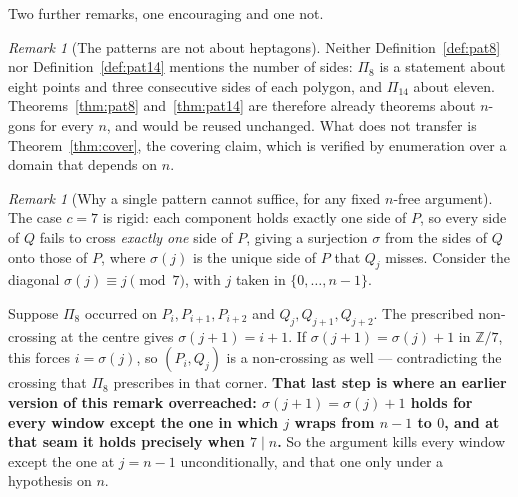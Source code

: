 \documentclass[11pt,a4paper]{article}
\theoremstyle{plain}
\theoremstyle{definition}
\theoremstyle{remark}
\newtheorem{remark}[theorem]{Remark}
\begin{document}
Two further remarks, one encouraging and one not.

\begin{remark}[The patterns are not about heptagons]
Neither Definition~\ref{def:pat8} nor Definition~\ref{def:pat14} mentions the
number of sides: $\Pi_8$ is a statement about eight points and three consecutive
sides of each polygon, and $\Pi_{14}$ about eleven. Theorems~\ref{thm:pat8}
and~\ref{thm:pat14} are therefore already theorems about $n$-gons for every $n$,
and would be reused unchanged. What does not transfer is
Theorem~\ref{thm:cover}, the covering claim, which is verified by enumeration
over a domain that depends on $n$.
\end{remark}

\begin{remark}[Why a single pattern cannot suffice, for any fixed $n$-free
argument]\label{rem:diagonal}
The case $c=7$ is rigid: each component holds exactly one side of $P$, so every
side of $Q$ fails to cross \emph{exactly one} side of $P$, giving a surjection
$\sigma$ from the sides of $Q$ onto those of $P$, where $\sigma(j)$ is the
unique side of $P$ that $Q_j$ misses. Consider the diagonal
$\sigma(j)\equiv j\pmod 7$, with $j$ taken in $\{0,\dots,n-1\}$.

Suppose $\Pi_8$ occurred on $P_i,P_{i+1},P_{i+2}$ and $Q_j,Q_{j+1},Q_{j+2}$.
The prescribed non-crossing at the centre gives $\sigma(j+1)=i+1$. If
$\sigma(j+1)=\sigma(j)+1$ in $\mathbb{Z}/7$, this forces $i=\sigma(j)$, so
$(P_i,Q_j)$ is a non-crossing as well --- contradicting the crossing that
$\Pi_8$ prescribes in that corner. \textbf{That last step is where an earlier
version of this remark overreached: $\sigma(j+1)=\sigma(j)+1$ holds for every
window except the one in which $j$ wraps from $n-1$ to $0$, and at that seam it
holds precisely when $7\mid n$.} So the argument kills every window except the
one at $j=n-1$ unconditionally, and that one only under a hypothesis on $n$.


\end{remark}
\end{document}
